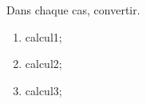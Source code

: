 \documentclass[exercice]{thedocument}%
\begin{document}
%
Dans chaque cas, convertir.
\begin{enumerate}
    \item \<calcul1;
    \item \<calcul2;
    \item \<calcul3;
\end{enumerate}
\end{document}
